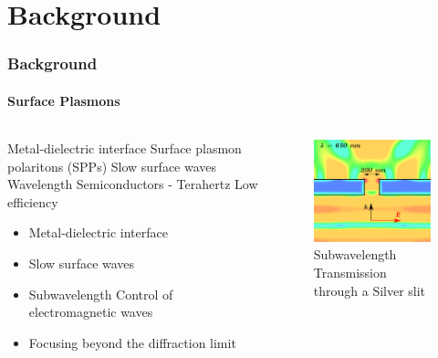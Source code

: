 \documentclass[mathserif,18pt,xcolor=table,c]{beamer}
\begin{document}
\section{Background}
\begin{frame}
  \frametitle{Background}
  \framesubtitle{Surface Plasmons}

  \begin{columns} %
    \begin{column}{.5\textwidth}
      \begin{minipage}[T][.1\textheight][c]{\linewidth}
        \begin{outline}[itemize]
          \1 Metal-dielectric interface
          \1 Surface plasmon polaritons (SPPs)
          \1 Slow surface waves
            \2 Wavelength
            \2 Semiconductors - Terahertz
          \1 Low efficiency
        \end{outline}
        \begin{itemize}
          \item Metal-dielectric interface
        \end{itemize}
        \begin{itemize}
          \item Slow surface waves
          \item Subwavelength Control of electromagnetic waves
          \item Focusing beyond the diffraction limit
        \end{itemize}
      \end{minipage}
    \end{column}
    \begin{column}{.5\textwidth}
      \begin{figure}
        \includegraphics[scale=.3]{E_squared_final.png}
        \caption{Subwavelength Transmission through a Silver slit}
      \end{figure}
      \end{column}%
    \end{columns}
  \end{frame}
\end{document}
